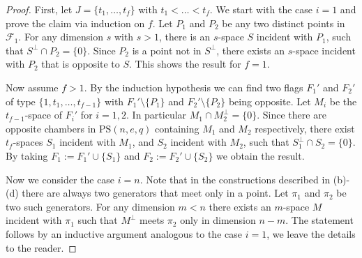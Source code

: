 \documentclass[11pt]{article}
\newcommand{\EKR}{\mathcal{F}}
\newcommand{\PS}{\mathrm{PS}}
\begin{document}
\begin{proof}
    First, let $J=\{t_1,\ldots,t_f \}$ with $t_1<\ldots<t_f$. We start with the case $i=1$ and prove the claim via induction on $f$. Let $P_1$ and $P_2$ be any two distinct points in $\EKR_1$. For any dimension $s$ with $s>1$, there is an $s$-space $S$ incident with $P_1$, such that $S^\perp\cap P_2=\{0\}$. Since $P_2$ is a point not in $S^\perp$, there exists an $s$-space incident with $P_2$ that is opposite to $S$. This shows the result for $f=1$.

    Now assume $f>1$. By the induction hypothesis we can find two flags $F_1'$ and $F_2'$ of type $\{ 1,t_1,\ldots,t_{f-1}\}$ with $F_1'\setminus\{P_1\}$ and $F_2'\setminus\{P_2\}$ being opposite. Let $M_i$ be the $t_{f-1}$-space of $F_i'$ for $i=1,2$. In particular $M_1\cap M_2^\perp=\{0\}$. Since there are opposite chambers in $\PS(n,e,q)$ containing $M_1$ and $M_2$ respectively, there exist $t_f$-spaces $S_1$ incident with $M_1$, and $S_2$ incident with $M_2$, such that $S_1^\perp \cap S_2=\{0\}$.
    By taking $F_1:=F_1'\cup \{ S_1\}$ and $F_2:=F_2'\cup \{S_2 \}$ we obtain the result. 

    Now we consider the case $i=n$. Note that in the constructions described in  (b)-(d) there are always two generators that meet only in a point. Let $\pi_1$ and $\pi_2$ be two such generators. For any dimension $m<n$ there exists an $m$-space $M$ incident with $\pi_1$ such that $M^\perp$ meets $\pi_2$ only in dimension $n-m$. The statement follows by an inductive argument analogous to the case $i=1$, we leave the details to the reader. 
\end{proof}
\end{document}
